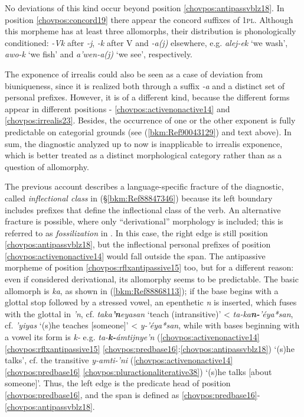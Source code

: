 \documentclass[output=paper]{langscibook}
\begin{document}
No deviations of this kind occur beyond position \ref{chovpos:antipassvblz18}. In position \ref{chovpos:concord19} there appear the concord suffixes of 1\textsc{pl}. Although this morpheme has at least three allomorphs, their distribution is phonologically conditioned: \textit{-Vk} after \textit{-j}, \textit{-k} after V and \textit{-a(j)} elsewhere, e.g. \textit{alej-ek} `we wash', \textit{awo-k} `we fish' and \textit{a'wen-a(j)} `we see', respectively.

The exponence of irrealis could also be seen as a case of deviation from biuniqueness, since it is realized both through a suffix \textit{-a} and a distinct set of personal prefixes. However, it is of a different kind, because the different forms appear in different positions - \ref{chovpos:activenonactive14} and \ref{chovpos:irrealis23}. Besides, the occurrence of one or the other exponent is fully predictable on categorial grounds (see (\ref{bkm:Ref90043129}) and text above). In sum, the diagnostic analyzed up to now is inapplicable to irrealis exponence, which is better treated as a distinct morphological category rather than as a question of allomorphy.

The previous account describes a language-specific fracture of the diagnostic, called \textit{inflectional class} in  (§\ref{bkm:Ref88847346}) because its left boundary includes prefixes that define the inflectional class of the verb. An alternative fracture is possible, where only ``derivational'' morphology is included; this is referred to as \textit{fossilization} in . In this case, the right edge is still position \ref{chovpos:antipassvblz18}, but the inflectional personal prefixes of position \ref{chovpos:activenonactive14} would fall outside the span. The antipassive morpheme of position \ref{chovpos:rflxantipassive15} too, but for a different reason: even if considered derivational, its allomorphy seems to be predictable. The basic allomorph is \textit{ka}, as shown in (\ref{bkm:Ref88868113}); if the base begins with a glottal stop followed by a stressed vowel, an epenthetic \textit{n} is inserted, which fuses with the glottal in \textit{'n}, cf. \textit{taka}\textbf{\textit{'n}}\textit{eyasan} `teach (intransitive)' < \textit{ta-ka}\textbf{\textit{n-}}\textit{'éya*san}, cf. \textit{'yiyas} `(s)he teaches [someone]' < \textit{y-'éya*san}, while with bases beginning with a vowel its form is \textit{k-} e.g. \textit{ta-}\textbf{\textit{k-}}\textit{ámtijnye'n} (\ref{chovpos:activenonactive14} \ref{chovpos:rflxantipassive15} \ref{chovpos:predbase16}:\ref{chovpos:antipassvblz18}) `(s)he talks', cf. the transitive \textit{y-amti-'ni} (\ref{chovpos:activenonactive14} \ref{chovpos:predbase16} \ref{chovpos:pluractionaliterative38}) `(s)he talks [about someone]'. Thus, the left edge is the predicate head of position \ref{chovpos:predbase16}, and the span is defined as \ref{chovpos:predbase16}{}-\ref{chovpos:antipassvblz18}.
\end{document}
